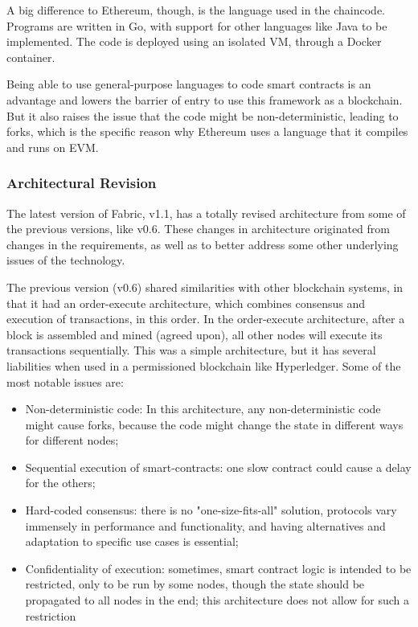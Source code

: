 A big difference to Ethereum, though, is the language used in the chaincode. Programs are written in Go, with support for other languages like Java to be implemented. The code is deployed using an isolated VM, through a Docker container. 

Being able to use general-purpose languages to code smart contracts is an advantage and lowers the barrier of entry to use this framework as a blockchain. But it also raises the issue that the code might be non-deterministic, leading to forks, which is the specific reason why Ethereum uses a language that it compiles and runs on EVM. 


\subsubsection{Architectural Revision}
The latest version of Fabric, v1.1, has a totally revised architecture from some of the previous versions, like v0.6. These changes in architecture originated from changes in the requirements, as well as to better address some other underlying issues of the technology.

The previous version (v0.6) shared similarities with other blockchain systems, in that it had an order-execute architecture, which combines consensus and execution of transactions, in this order. In the order-execute architecture, after a block is assembled and mined (agreed upon), all other nodes will execute its transactions sequentially.
This was a simple architecture, but it has several liabilities when used in a permissioned blockchain like Hyperledger. Some of the most notable issues are:
\begin{itemize}
\item Non-deterministic code: In this architecture, any non-deterministic code might cause forks, because the code might change the state in different ways for different nodes;
\item Sequential execution of smart-contracts: one slow contract could cause a delay for the others;
\item Hard-coded consensus: there is no "one-size-fits-all" solution, protocols vary immensely in performance and functionality, and having alternatives and adaptation to specific use cases is essential;
\item Confidentiality of execution: sometimes, smart contract logic is intended to be restricted, only to be run by some nodes, though the state should be propagated to all nodes in the end; this architecture does not allow for such a restriction
\end{itemize}

